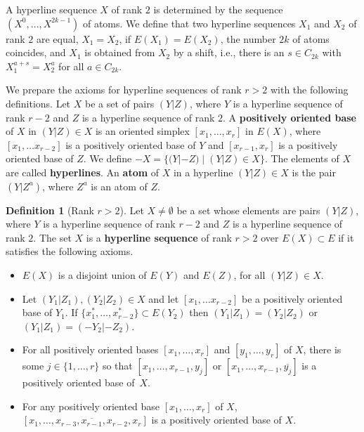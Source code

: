 \documentclass[a4paper]{amsart}
\newcommand{\begriff}[1]{\textbf{#1}}
\theoremstyle{definition}
\newtheorem{definition}{Definition}
\theoremstyle{remark}
\begin{document}
A hyperline sequence $X$ of rank $2$ is determined by the sequence
$(X^0,\dots, X^{2k-1})$ of atoms.  We define that two hyperline
sequences $X_1$ and $X_2$ of rank $2$ are equal, $X_1=X_2$, if
$E(X_1)=E(X_2)$, the number $2k$ of atoms coincides, and $X_1$ is
obtained from $X_2$ by a shift, i.e., there is an $s\in C_{2k}$ with
$X_1^{a+s} = X_2^a$ for all $a\in C_{2k}$.
%

We prepare the axioms for hyperline 
sequences of rank $r>2$ with the following definitions. 
Let $X$ be a set of pairs $(Y|Z)$, where $Y$ is a hyperline sequence 
of rank $r-2$ and $Z$ is a hyperline sequence of rank $2$.
A \begriff{positively oriented base} of $X$ in $(Y|Z)\in X$ is an
oriented simplex $[x_1,\dots,x_{r}]$ in $E(X)$, where $[x_1,\dots
x_{r-2}]$ is a positively oriented base of $Y$ and $[x_{r-1},x_r]$
is a positively oriented base of $Z$.
%
We define $-X = \{ (Y|-Z) \;|\; (Y|Z)\in X\}$. The elements of
  $X$ are called \begriff{hyperlines}. An \begriff{atom} of $X$ in a
  hyperline $(Y|Z)\in X$ is the pair $(Y|Z^a)$, where $Z^a$ is an atom
  of $Z$.

\begin{definition}[Rank $r>2$]
  Let $X \not=\emptyset$ be a set whose elements are pairs $(Y|Z)$,
  where $Y$ is a hyperline sequence of rank $r-2$ and $Z$ is a
  hyperline sequence of rank $2$.
%
  The set $X$ is a \begriff{hyperline sequence} of rank $r>2$ over
  $E(X)\subset E$ if it satisfies the following axioms.
  \begin{itemize}
  \item[(H1)] $E(X)$ is a disjoint union of $E(Y)$ and $E(Z)$, for all
    $(Y|Z)\in X$.
  \item[(H2)] Let $(Y_1|Z_1), (Y_2|Z_2)\in X$ and let $[x_1,\dots
    x_{r-2}]$ be a positively oriented base of $Y_1$.
    If $\{x_1^*,\dots, x_{r-2}^*\}\subset E(Y_2)$ then 
    $(Y_1|Z_1) = (Y_2|Z_2)$ or $(Y_1|Z_1) = (-Y_2|-Z_2)$.
  \item[(H3)] For all positively oriented bases $[x_1,\dots, x_r]$ and
    $[y_1,\dots,y_r]$ of $X$, there is some $j\in\{1,\dots,r\}$ so
    that $[x_1,\dots, x_{r-1},y_j]$ or $[x_1,\dots,
    x_{r-1},\overline{y_j}]$ is a positively oriented base of~$X$.
  \item[(H4)] For any positively oriented base $[x_1,\dots, x_r]$ of
    $X$, $[x_1,\dots,x_{r-3},\overline{x_{r-1}},x_{r-2},x_r]$ is a
    positively oriented base of $X$.
  \end{itemize}
\end{definition}
\end{document}
